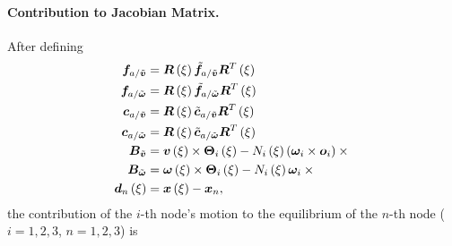 \paragraph{Contribution to Jacobian Matrix.}
After defining
\begin{subequations}
\begin{align}
	\bm{f}_{a/\tilde{\bm{v}}} &= \bm{R}\left( \xi \right) \tilde{\bm{f}}_{a/\tilde{\bm{v}}} \bm{R}^T\left( \xi \right) \\
	\bm{f}_{a/\tilde{\bm{\omega}}} &= \bm{R}\left( \xi \right) \tilde{\bm{f}}_{a/\tilde{\bm{\omega}}} \bm{R}^T\left( \xi \right) \\
	\bm{c}_{a/\tilde{\bm{v}}} &= \bm{R}\left( \xi \right) \tilde{\bm{c}}_{a/\tilde{\bm{v}}} \bm{R}^T\left( \xi \right) \\
	\bm{c}_{a/\tilde{\bm{\omega}}} &= \bm{R}\left( \xi \right) \tilde{\bm{c}}_{a/\tilde{\bm{\omega}}} \bm{R}^T\left( \xi \right) \\
	\bm{B}_{\tilde{\bm{v}}} &= \bm{v}\left( \xi \right) \times \bm{\Theta}_i\left( \xi \right)
		- N_i\left( \xi \right) \left( \bm{\omega}_i \times \bm{o}_i \right) \times{} \\
	\bm{B}_{\tilde{\bm{\omega}}} &= \bm{\omega}\left( \xi \right) \times \bm{\Theta}_i\left( \xi \right)
		- N_i\left( \xi \right) \bm{\omega}_i \times{} \\
	\bm{d}_n\left( \xi \right) &= \bm{x}\left( \xi \right) - \bm{x}_n
	,
\end{align}
\end{subequations}
the contribution of the $i$-th node's motion to the equilibrium
of the $n$-th node ($i=1,2,3$, $n=1,2,3$) is
